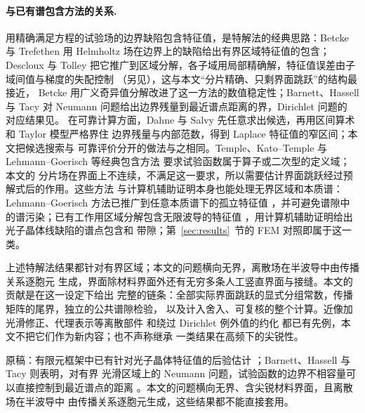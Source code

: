 \paragraph{与已有谱包含方法的关系.}
用精确满足方程的试验场的边界缺陷包含特征值，是特解法的经典思路\cite{MolerPayne1968}：Betcke 与 Trefethen
用 Helmholtz 场在边界上的缺陷给出有界区域特征值的包含\cite{BetckeTrefethen2005}；
Descloux 与 Tolley 把它推广到区域分解，各子域用局部精确解，特征值误差由子域间值与梯度的失配控制
\cite{DesclouxTolley1983}（另见\cite[引理~2.1]{Betcke2007}），这与本文“分片精确、只剩界面跳跃”的结构最接近，
Betcke 用广义奇异值分解改进了这一方法的数值稳定性\cite{Betcke2007}；Barnett、Hassell
与 Tacy 对 Neumann 问题给出边界残量到最近谱点距离的界\cite{BarnettHassellTacy2018}，Dirichlet 问题的
对应结果见\cite{BarnettHassell2011}。
在可靠计算方面，Dahne 与 Salvy 先任意求出候选，再用区间算术和 Taylor 模型严格界住
边界残量与内部范数，得到 Laplace 特征值的窄区间\cite{DahneSalvy2020}；本文把候选搜索与
可靠评价分开的做法与之相同。Temple、Kato--Temple 与 Lehmann--Goerisch 等经典包含方法
\cite{Temple1928,NakaoPlumWatanabe2019} 要求试验函数属于算子或二次型的定义域；本文的
分片场在界面上不连续，不满足这一要求，所以需要估计界面跳跃经过预解式后的作用。这些方法
与计算机辅助证明本身也能处理无界区域和本质谱：Lehmann--Goerisch 方法已推广到任意本质谱下的孤立特征值
\cite{ZimmermannMertins1995}，并可避免谱隙中的谱污染\cite{DaviesPlum2004}；已有工作用区域分解包含无限波导的特征值
\cite{BehnkeMertinsPlumWieners2000}，用计算机辅助证明给出光子晶体线缺陷的谱点包含和
带隙\cite{BrownHoangPlumWood2009,HoangPlumWieners2009}；第~\ref{sec:results}~节的 FEM
对照即属于这一类。

上述特解法结果都针对有界区域；本文的问题横向无界，离散场在半波导中由传播关系逐胞元
生成，界面除材料界面外还有无穷多条人工竖直界面与接缝。本文的贡献是在这一设定下给出
完整的链条：全部实际界面跳跃的显式分组常数，传播矩阵的尾界，独立的公共谱隙检验，
以及计入舍入、可复核的整个计算。近像加光滑修正、代理表示等离散部件
\cite{BarnettGreengard2010,BarnettGreengard2011,ChoBarnett2015} 和绕过 Dirichlet 例外值的约化
\cite{FlissKlindworthSchmidt2015} 都已有先例，本文不把它们作为新内容；也不声称继承
\cite{BarnettHassell2011,BarnettHassellTacy2018} 一类结果在高频下的尖锐性。
\begin{workonly}
原稿：有限元框架中已有针对光子晶体特征值的后验估计
\cite{Giani2013,EngstromGianiGrubisic2016}；Barnett、Hassell 与 Tacy 则表明，对有界
光滑区域上的 Neumann 问题，试验函数的边界不相容量可以直接控制到最近谱点的距离
\cite{BarnettHassellTacy2018}。本文的问题横向无界、含尖锐材料界面，且离散场在半波导中
由传播关系逐胞元生成，这些结果都不能直接套用。
\end{workonly}

